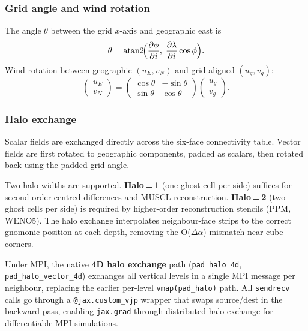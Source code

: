 \documentclass[11pt,a4paper]{article}
\newcommand{\pp}{\partial}
\begin{document}
\subsubsection{Grid angle and wind rotation}
The angle $\theta$ between the grid $x$-axis and geographic east is
\begin{equation}
  \theta = \mathrm{atan2}\!\Bigl(\frac{\pp\phi}{\pp i},\;\frac{\pp\lambda}{\pp i}\cos\phi\Bigr).
\end{equation}
Wind rotation between geographic $(u_E,v_N)$ and grid-aligned $(u_g,v_g)$:
\begin{equation}
  \begin{pmatrix}u_E\\v_N\end{pmatrix}
  =\begin{pmatrix}\cos\theta&-\sin\theta\\\sin\theta&\cos\theta\end{pmatrix}
  \begin{pmatrix}u_g\\v_g\end{pmatrix}.
\end{equation}

\subsubsection{Halo exchange}
Scalar fields are exchanged directly across the six-face connectivity table.  Vector fields are first rotated to geographic components, padded as scalars, then rotated back using the padded grid angle.

Two halo widths are supported.  \textbf{Halo\,=\,1} (one ghost cell per side) suffices for second-order centred differences and MUSCL reconstruction.  \textbf{Halo\,=\,2} (two ghost cells per side) is required by higher-order reconstruction stencils (PPM, WENO5).  The halo exchange interpolates neighbour-face strips to the correct gnomonic position at each depth, removing the O($\Delta\alpha$) mismatch near cube corners.

Under MPI, the native \textbf{4D halo exchange} path (\texttt{pad\_halo\_4d}, \texttt{pad\_halo\_vector\_4d}) exchanges all vertical levels in a single MPI message per neighbour, replacing the earlier per-level \texttt{vmap(pad\_halo)} path.  All \texttt{sendrecv} calls go through a \texttt{@jax.custom\_vjp} wrapper that swaps source/dest in the backward pass, enabling \texttt{jax.grad} through distributed halo exchange for differentiable MPI simulations.
\end{document}
